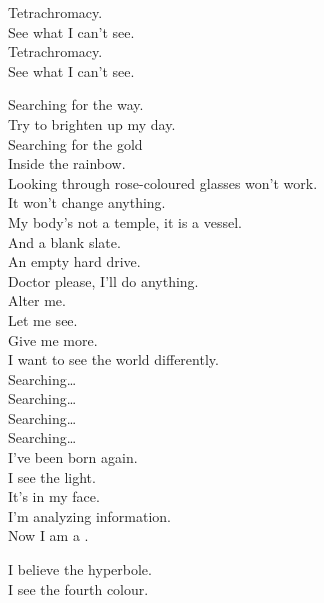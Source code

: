 Tetrachromacy. \\
See what I can't see. \\
Tetrachromacy. \\
See what I can't see. \\




Searching for the way. \\
Try to brighten up my day. \\
Searching for the gold \\
Inside the rainbow. \\
Looking through rose-coloured glasses won't work. \\
It won't change anything. \\

My body's not a temple, it is a vessel. \\
And a blank slate. \\
An empty hard drive. \\
Doctor please, I'll do anything. \\
Alter me. \\
Let me see. \\
Give me more. \\
I want to see the world differently. \\

Searching… \\
Searching… \\
Searching… \\
Searching… \\

I've been born again. \\
I see the light. \\
It's in my face. \\
I'm analyzing information. \\
Now I am a . \\




I believe the hyperbole. \\
I see the fourth colour. \\

